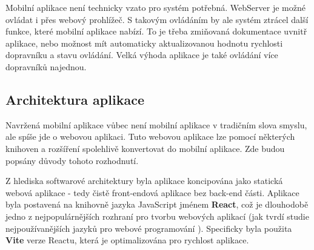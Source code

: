Mobilní aplikace není technicky vzato pro systém potřebná. WebServer je možné ovládat i přes webový prohlížeč. S takovým ovládáním by ale systém ztrácel další funkce, které mobilní aplikace nabízí. To je třeba zmiňovaná dokumentace uvnitř aplikace, nebo možnost mít automaticky aktualizovanou hodnotu rychlosti dopravníku a stavu ovládání. Velká výhoda aplikace je také ovládání více dopravníků najednou.

\subsection{Architektura aplikace}

Navržená mobilní aplikace vůbec není mobilní aplikace v tradičním slova smyslu, ale spíše jde o webovou aplikaci. Tuto webovou aplikace lze pomocí některých knihoven a rozšíření spolehlivě konvertovat do mobilní aplikace. Zde budou popsány důvody tohoto rozhodnutí.




Z hlediska softwarové architektury byla aplikace koncipována jako statická webová aplikace - tedy čistě front-endová aplikace bez back-end části. Aplikace byla postavená na knihovně jazyka JavaScript jménem \textbf{React}, což je dlouhodobě jedno z nejpopulárnějších rozhraní pro tvorbu webových aplikací (jak tvrdí studie nejpoužívanějších jazyků pro webové programování \cite{ReactWebDeveloperPopularity}). Specificky byla použita \textbf{Vite} verze Reactu, která je optimalizována pro rychlost aplikace.
\cite{ViteReactWeb}

